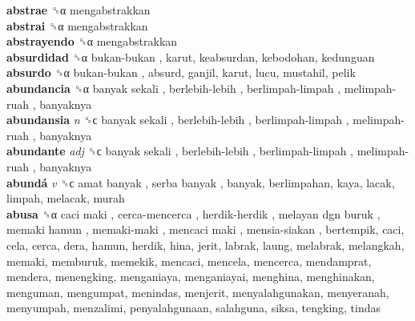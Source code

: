 \textbf{abstrae} ␝α  mengabstrakkan  \\
\textbf{abstrai} ␝α  mengabstrakkan  \\
\textbf{abstrayendo} ␝α  mengabstrakkan  \\
\textbf{absurdidad} ␝α   bukan-bukan , karut, keabsurdan, kebodohan, kedunguan  \\
\textbf{absurdo} ␝α   bukan-bukan , absurd, ganjil, karut, lucu, mustahil, pelik  \\
\textbf{abundancia} ␝α   banyak sekali ,  berlebih-lebih ,  berlimpah-limpah ,  melimpah-ruah , banyaknya  \\
\textbf{abundansia} \emph{n}  ␝ϲ   banyak sekali ,  berlebih-lebih ,  berlimpah-limpah ,  melimpah-ruah , banyaknya  \\
\textbf{abundante} \emph{adj}  ␝ϲ   banyak sekali ,  berlebih-lebih ,  berlimpah-limpah ,  melimpah-ruah , banyaknya  \\
\textbf{abundá} \emph{v}  ␝ϲ   amat banyak ,  serba banyak , banyak, berlimpahan, kaya, lacak, limpah, melacak, murah  \\
\textbf{abusa} ␝α   caci maki ,  cerca-mencerca ,  herdik-herdik ,  melayan dgn buruk ,  memaki hamun ,  memaki-maki ,  mencaci maki ,  mensia-siakan , bertempik, caci, cela, cerca, dera, hamun, herdik, hina, jerit, labrak, laung, melabrak, melangkah, memaki, memburuk, memekik, mencaci, mencela, mencerca, mendamprat, mendera, menengking, menganiaya, menganiayai, menghina, menghinakan, menguman, mengumpat, menindas, menjerit, menyalahgunakan, menyeranah, menyumpah, menzalimi, penyalahgunaan, salahguna, siksa, tengking, tindas  \\

